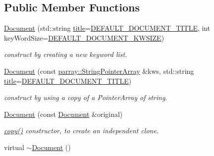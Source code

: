 \subsection*{Public Member Functions}
\begin{DoxyCompactItemize}
\item 
\hypertarget{classdocs_1_1Document_ace8d18f691181e1676a6ca5207da336b}{\hyperlink{classdocs_1_1Document_ace8d18f691181e1676a6ca5207da336b}{Document} (std\-::string \hyperlink{classdocs_1_1Document_a419e4470c20e1bddd60448ba430f4738}{title}=\hyperlink{namespacedocs_a4cf6dd6732c7e7ab7f7855e440485d89}{D\-E\-F\-A\-U\-L\-T\-\_\-\-D\-O\-C\-U\-M\-E\-N\-T\-\_\-\-T\-I\-T\-L\-E}, int key\-Word\-Size=\hyperlink{namespacedocs_ae635b9481a61628036b5a97625856475}{D\-E\-F\-A\-U\-L\-T\-\_\-\-D\-O\-C\-U\-M\-E\-N\-T\-\_\-\-K\-W\-S\-I\-Z\-E})}\label{classdocs_1_1Document_ace8d18f691181e1676a6ca5207da336b}

\begin{DoxyCompactList}\small\item\em construct by creating a new keyword list. \end{DoxyCompactList}\item 
\hypertarget{classdocs_1_1Document_aa9c1a4e9b6aab58e8e28b16a2888e601}{\hyperlink{classdocs_1_1Document_aa9c1a4e9b6aab58e8e28b16a2888e601}{Document} (const \hyperlink{classparray_1_1StringPointerArray}{parray\-::\-String\-Pointer\-Array} \&kws, std\-::string \hyperlink{classdocs_1_1Document_a419e4470c20e1bddd60448ba430f4738}{title}=\hyperlink{namespacedocs_a4cf6dd6732c7e7ab7f7855e440485d89}{D\-E\-F\-A\-U\-L\-T\-\_\-\-D\-O\-C\-U\-M\-E\-N\-T\-\_\-\-T\-I\-T\-L\-E})}\label{classdocs_1_1Document_aa9c1a4e9b6aab58e8e28b16a2888e601}

\begin{DoxyCompactList}\small\item\em construct by using a copy of a Pointer\-Array of string. \end{DoxyCompactList}\item 
\hypertarget{classdocs_1_1Document_ad65291ea47b0be5a29d2ba13868a8a7c}{\hyperlink{classdocs_1_1Document_ad65291ea47b0be5a29d2ba13868a8a7c}{Document} (const \hyperlink{classdocs_1_1Document}{Document} \&original)}\label{classdocs_1_1Document_ad65291ea47b0be5a29d2ba13868a8a7c}

\begin{DoxyCompactList}\small\item\em \hyperlink{classdocs_1_1Document_ad8b6a91c7a8e39a880790d14aba14322}{copy()} constructor, to create an independent clone. \end{DoxyCompactList}\item 
\hypertarget{classdocs_1_1Document_abcb73ac5ddf4e7b0c862220228b85b9e}{virtual \hyperlink{classdocs_1_1Document_abcb73ac5ddf4e7b0c862220228b85b9e}{$\sim$\-Document} ()}\label{classdocs_1_1Document_abcb73ac5ddf4e7b0c862220228b85b9e}


\end{DoxyCompactItemize}
